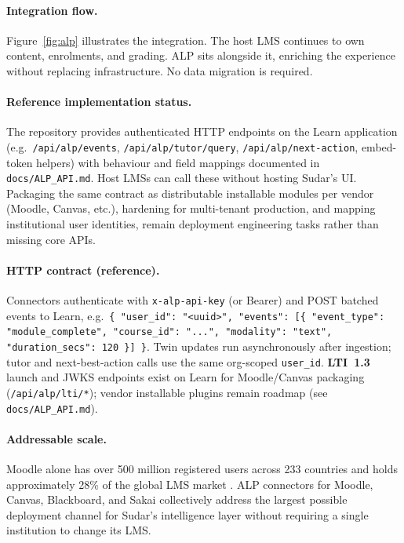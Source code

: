 \documentclass[10pt,twocolumn]{article}
\begin{document}
\paragraph{Integration flow.}
Figure~\ref{fig:alp} illustrates the integration. The host LMS
continues to own content, enrolments, and grading. ALP sits alongside
it, enriching the experience without replacing infrastructure. No data
migration is required.

\paragraph{Reference implementation status.}
The repository provides authenticated HTTP endpoints on the Learn
application (e.g.\ \texttt{/api/alp/events}, \texttt{/api/alp/tutor/query},
\texttt{/api/alp/next-action}, embed-token helpers) with behaviour and
field mappings documented in \texttt{docs/ALP\_API.md}. Host LMSs can
call these without hosting Sudar's UI. Packaging the same contract as
distributable installable modules per vendor (Moodle, Canvas, etc.),
hardening for multi-tenant production, and mapping institutional user
identities, remain deployment engineering tasks rather than missing
core APIs.

\paragraph{HTTP contract (reference).}
Connectors authenticate with \texttt{x-alp-api-key} (or Bearer) and
POST batched events to Learn, e.g.\
\texttt{\{ "user\_id": "<uuid>", "events": [\{ "event\_type":
"module\_complete", "course\_id": "...", "modality": "text",
"duration\_secs": 120 \}] \}}.
Twin updates run asynchronously after ingestion; tutor and
next-best-action calls use the same org-scoped \texttt{user\_id}.
\textbf{LTI~1.3} launch and JWKS endpoints exist on Learn for Moodle/Canvas
packaging (\texttt{/api/alp/lti/*}); vendor installable plugins remain
roadmap (see \texttt{docs/ALP\_API.md}).

\paragraph{Addressable scale.}
Moodle alone has over 500 million registered users across 233 countries
and holds approximately 28\% of the global LMS market
\cite{moodle2025stats}. ALP connectors for Moodle, Canvas, Blackboard,
and Sakai collectively address the largest possible deployment channel
for Sudar's intelligence layer without requiring a single institution
to change its LMS.
\end{document}
